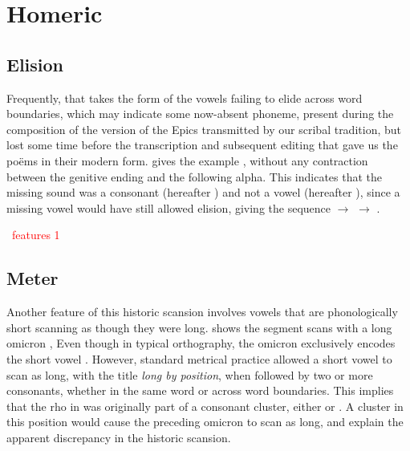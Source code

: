 \section{Homeric}\label{sec:Homeric}

\subsection{Elision}\label{subsec:Elision}
Frequently, that takes the form
of the vowels failing to elide across word boundaries, which may indicate some now-absent
phoneme, present during the composition of the version of the Epics transmitted by our
scribal tradition, but lost some time before the transcription and subsequent editing that gave
us the po\"ems in their modern form.  gives the example
,\autocite[XV.214]{Iliad_1999}
without any contraction between the genitive ending
 and the following alpha.
This indicates that the missing sound was a consonant (hereafter \w) and not
a vowel (hereafter \vowel), since a missing vowel would have still allowed elision,
giving the sequence  $\to$ 
$\to$ .

\textcolor{red}{\w\ features 1}

\subsection{Meter}\label{subsec:Meter}
Another feature of this historic scansion involves vowels
that are phonologically short scanning as though they were long.
 shows the segment  scans with a long omicron
,\autocite[V.306]{Iliad_1999}
Even though in typical orthography, the omicron  exclusively encodes the
short vowel .
However, standard metrical practice allowed a short vowel to scan as long, with the title
\textit{long by position},
when followed by two or more consonants, whether in the same word or across word boundaries. This implies
that the rho  in  was originally part of a consonant
cluster, either  or . A cluster in this position would cause the
preceding omicron  to scan as long, and explain the apparent discrepancy
in the historic scansion.

